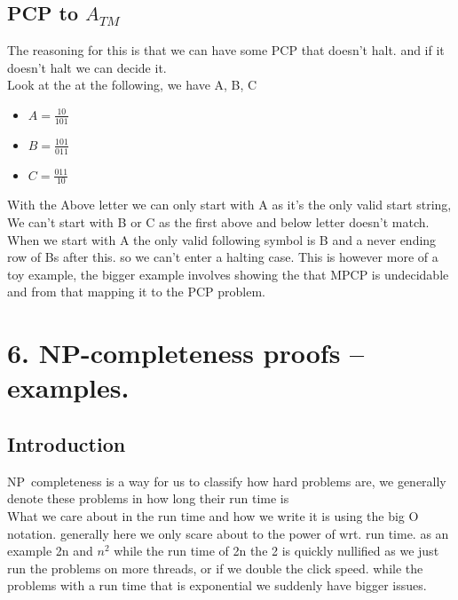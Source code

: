 \documentclass[a4paper,10pt,titlepage]{report}
\begin{document}
\subsection{PCP to $A_{TM}$}


The reasoning for this is that we can have some PCP that doesn't halt. and if it doesn't halt we can decide it. \\

Look at the at the following, we have A, B, C\\
\begin{itemize}
\item $ A = \frac{10}{101}$
\item $ B = \frac{101}{011}$
\item $ C = \frac{011}{10} $
\end{itemize}

With the Above letter we can only start with A as it's the only valid start string, We can't start with B or C as the first above and below letter doesn't match.\\

When we start with A the only valid following symbol is B and a never ending row of Bs after this. so we can't enter a halting case. This is however more of a toy example, the bigger example involves showing the that MPCP is undecidable and from that mapping it to the PCP problem.\\





\newpage
\section{6. NP-completeness proofs – examples.}
\subsection{Introduction}
NP\ completeness is a way for us to classify how hard problems are, we generally denote these problems in how long their run time is\\

What we care about in the run time and how we write it is using the big O notation. generally here we only scare about to the power of wrt. run time. as an example 2n and $n^2$ while the run time of 2n the 2 is quickly nullified as we just run the problems on more threads, or if we double the click speed. while the problems with a run time that is exponential we suddenly have bigger issues. 
\end{document}
